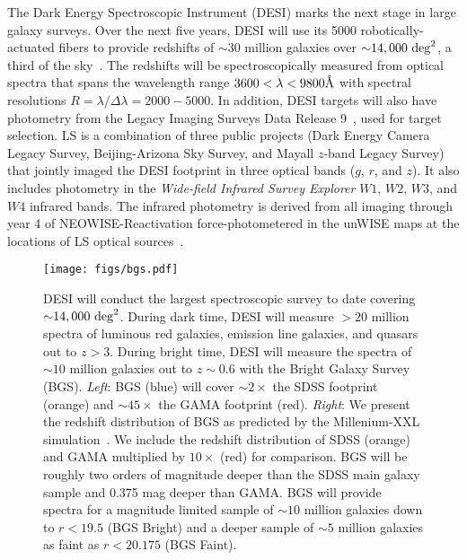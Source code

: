 The Dark Energy Spectroscopic Instrument (DESI) marks the next stage in large
galaxy surveys. 
Over the next five years, DESI will use its 5000 robotically-actuated fibers to
provide redshifts of ${\sim}30$ million galaxies over 
${\sim}14,000~{\rm deg}^2$, a third of the sky~\citep{desicollaboration2016,
desicollaboration2016a}.
The redshifts will be spectroscopically measured from optical spectra that
spans the wavelength range $3600 < \lambda < 9800\AA$ with spectral resolutions
$R = \lambda/\Delta \lambda = 2000 - 5000$.
In addition, DESI targets will also have photometry from the Legacy Imaging
Surveys Data Release 9~\citep[LS;][]{dey2019}, used for target selection. 
LS is a combination of three public projects (Dark Energy Camera Legacy Survey,
Beijing-Arizona Sky Survey, and Mayall $z$-band Legacy Survey) that jointly
imaged the DESI footprint in three optical bands ($g$, $r$, and $z$). 
It also includes photometry in the \emph{Wide-field Infrared Survey Explorer}
$W1$, $W2$, $W3$, and $W4$ infrared bands.
The infrared photometry is derived from all imaging through year 4 of
NEOWISE-Reactivation force-photometered in the unWISE maps at the locations of
LS optical sources~\citep{meisner2017, meisner2017a}.

\begin{figure}
\begin{center}
\texttt{[image: figs/bgs.pdf]} 
\caption{
    DESI will conduct the largest spectroscopic survey to date covering
    ${\sim}14,000~{\rm deg}^2$. 
    During dark time, DESI will measure ${>}20$ million spectra of luminous red
    galaxies, emission line galaxies, and quasars out to $z > 3$.
    During bright time, DESI will measure the spectra of ${\sim}10$ million
    galaxies out to $z{\sim}0.6$ with the Bright Galaxy Survey (BGS).
    {\em Left}: BGS (blue) will cover ${\sim}2\times$ the SDSS footprint
    (orange) and ${\sim}45\times$ the GAMA footprint (red).
    {\em Right}: We present the redshift distribution of BGS as predicted by
    the Millenium-XXL simulation~\citep[blue;][]{smith2017}. 
    We include the redshift distribution of SDSS (orange) and GAMA multiplied
    by $10\times$ (red) for comparison. 
    BGS will be roughly two orders of magnitude deeper than the SDSS main
    galaxy sample and 0.375 mag deeper than GAMA.
    BGS will provide spectra for a magnitude limited sample of ${\sim}10$
    million galaxies down to $r < 19.5$ (BGS Bright) and a deeper sample of
    ${\sim 5}$ million galaxies as faint as $r < 20.175$ (BGS Faint).
}
\label{fig:bgs}
\end{center}
\end{figure}

